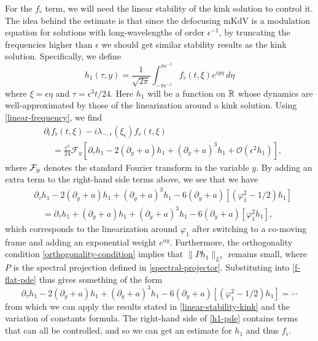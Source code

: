 For the \(f_\flat\) term, we will need the linear stability of the kink solution to control it. The idea behind the estimate is that since the defocusing mKdV is a modulation equation for solutions with long-wavelengths of order \(\epsilon^{-1}\), by truncating the frequencies higher than \(\epsilon\) we should get similar stability results as the kink solution. Specifically, we define
\begin{equation*} 
	h_1(\tau, y) = \frac 1 {\sqrt {2\pi}} \int_{-\pi\epsilon^{-1}}^{\pi \epsilon^{-1}} f_\flat (t, \xi) e^{iy\eta}\, d \eta 
\end{equation*} 
where \(\xi = \epsilon \eta\) and \(\tau = \epsilon^3 t/24\). Here \(h_1\) will be a function on \(\mathbb{R}\) whose dynamics are well-approximated by those of the linearization around a kink solution. Using \cref{linear-frequency}, we find 
\begin{equation*} 
	\begin{aligned}
		&\partial_t f_\flat (t,\xi) - i \lambda_{-,\epsilon}(\xi_\epsilon) f_\flat(t,\xi) \\
		&\quad = \frac{\epsilon^3}{24} \mathcal F_y[\partial_\tau h_1 - 2 (\partial_y + a) h_1 + (\partial_y + a)^3 h_1 + \mathcal O(\epsilon^2 h_1)],
	\end{aligned}
\end{equation*} 
where \(\mathcal{F}_y\) denotes the standard Fourier transform in the variable \(y\). By adding an extra term to the right-hand side terms above, we see that we have
\begin{equation*} 
	\begin{aligned}
		&\partial_\tau h_1 - 2(\partial_y + a) h_1 + (\partial_y + a)^3 h_1 - 6 (\partial_y + a) [(\varphi_1^2 - 1/2) h_1 ]\\
		&\quad= \partial_\tau h_1 + (\partial_y + a ) h_1 + (\partial_y +a)^3 h_1 - 6 (\partial_y + a) [\varphi_1^2 h_1],
	\end{aligned}
\end{equation*} 
which corresponds to the linearization around \(\varphi_1\) after switching to a co-moving frame and adding an exponential weight \(e^{ay}\). Furthermore, the orthogonality condition \cref{orthogonality-condition} implies that \( \| P h_1 \|_{L^2}\) remains small, where \(P\) is the spectral projection defined in \cref{spectral-projector}. Substituting into \cref{f-flat-pde} thus gives something of the form
\begin{equation}\label{h1-pde}
	\partial_\tau h_1 - 2(\partial_y + a) h_1 + (\partial_y + a)^3 h_1 - 6 (\partial_y + a) [(\varphi_1^2 - 1/2) h_1 ] = \cdots
\end{equation}
from which we can apply the results stated in \cref{linear-stability-kink} and the variation of constants formula. The right-hand side of \cref{h1-pde} contains terms that can all be controlled, and so we can get an estimate for \(h_1\) and thus \(f_\flat\).

